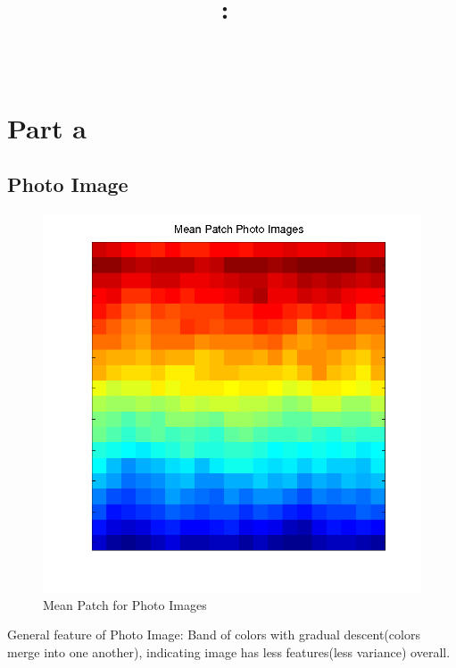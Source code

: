 \documentclass[12pt,english]{article}
\title{
\vspace{2in}
\textmd{\textbf{\hmwkClass:\ \hmwkTitle}}\\
}
\author{\textbf{\hmwkAuthorName} \\
        \textbf{\hmwkAuthorID}
        }
\date{} %
\begin{document}
\maketitle
\newpage

\section{Part a}

\subsection{Photo Image}
\begin{figure}
    \includegraphics[width=\linewidth]{Mean-Patch-Photo-Images}
    \caption{Mean Patch for Photo Images}
\end{figure}
General feature of Photo Image: Band of colors with gradual descent(colors merge into one another), indicating image has less features(less variance)
overall.
\end{document}
